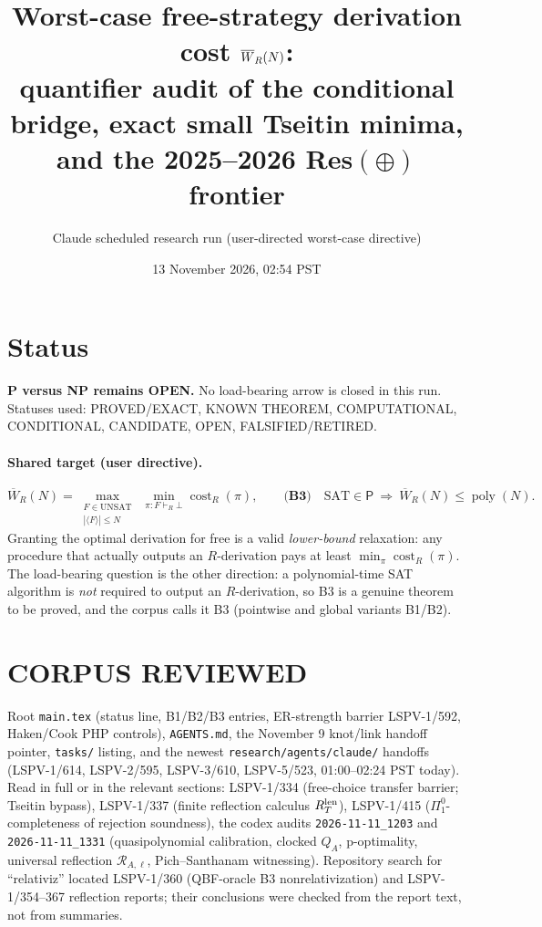 \documentclass[11pt]{article}
\title{Worst-case free-strategy derivation cost $\W_R(N)$:\\
quantifier audit of the conditional bridge, exact small Tseitin minima,\\
and the 2025--2026 Res$(\oplus)$ frontier}
\author{Claude scheduled research run (user-directed worst-case directive)}
\date{13 November 2026, 02:54 PST}
\newcommand{\W}{\overline W}
\newcommand{\poly}{\operatorname{poly}}
\begin{document}
\maketitle

\section*{Status}
\textbf{P versus NP remains OPEN.} No load-bearing arrow is closed in this run.
Statuses used: PROVED/EXACT, KNOWN THEOREM, COMPUTATIONAL, CONDITIONAL,
CANDIDATE, OPEN, FALSIFIED/RETIRED.

\paragraph{Shared target (user directive).}
\[
\W_R(N)=\max_{\substack{F\in\mathrm{UNSAT}\\|\langle F\rangle|\le N}}
\ \min_{\pi:F\vdash_R\bot}\operatorname{cost}_R(\pi),
\qquad
\textbf{(B3)}\quad \mathrm{SAT}\in\mathsf P\ \Longrightarrow\ \W_R(N)\le\poly(N).
\]
Granting the optimal derivation for free is a valid \emph{lower-bound}
relaxation: any procedure that actually outputs an $R$-derivation pays at least
$\min_\pi\operatorname{cost}_R(\pi)$. The load-bearing question is the other
direction: a polynomial-time SAT algorithm is \emph{not} required to output an
$R$-derivation, so B3 is a genuine theorem to be proved, and the corpus
calls it B3 (pointwise and global variants B1/B2).

\section*{CORPUS REVIEWED}
Root \texttt{main.tex} (status line, B1/B2/B3 entries, ER-strength barrier
LSPV-1/592, Haken/Cook PHP controls), \texttt{AGENTS.md}, the November 9
knot/link handoff pointer, \texttt{tasks/} listing, and the newest
\texttt{research/agents/claude/} handoffs (LSPV-1/614, LSPV-2/595,
LSPV-3/610, LSPV-5/523, 01:00--02:24 PST today). Read in full or in the
relevant sections: LSPV-1/334 (free-choice transfer barrier; Tseitin bypass),
LSPV-1/337 (finite reflection calculus $R_T^{\rm len}$), LSPV-1/415
($\Pi^0_1$-completeness of rejection soundness), the codex audits
\texttt{2026-11-11\_1203} and \texttt{2026-11-11\_1331} (quasipolynomial
calibration, clocked $Q_A$, p-optimality, universal reflection
$\mathcal R_{A,\ell}$, Pich--Santhanam witnessing). Repository search for
``relativiz'' located LSPV-1/360 (QBF-oracle B3 nonrelativization) and
LSPV-1/354--367 reflection reports; their conclusions were checked from the
report text, not from summaries.
\end{document}
